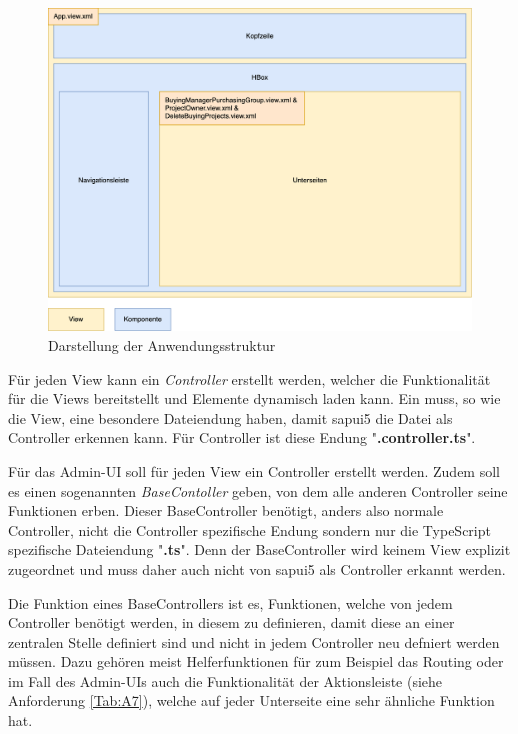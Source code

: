 \begin{figure}[H]
    \centering
    \includegraphics[width=\linewidth]{Images/AppStructure.png}
    \caption[Darstellung der Anwendungsstruktur]{Darstellung der Anwendungsstruktur}
    \label{fig:appstructure}
\end{figure}

Für jeden View kann ein \textit{Controller} erstellt werden, welcher die Funktionalität für die Views bereitstellt und Elemente dynamisch laden kann. 
Ein muss, so wie die View, eine besondere Dateiendung haben, damit \gls{sapui5} die Datei als Controller erkennen kann. Für Controller ist diese Endung "\textbf{.controller.ts}".

Für das Admin-UI soll für jeden View ein Controller erstellt werden. Zudem soll es einen sogenannten \textit{BaseContoller} geben, von dem alle anderen Controller seine Funktionen erben.
Dieser BaseController benötigt, anders also normale Controller, nicht die Controller spezifische Endung sondern nur die TypeScript spezifische Dateiendung "\textbf{.ts}".
Denn der BaseController wird keinem View explizit zugeordnet und muss daher auch nicht von \gls{sapui5} als Controller erkannt werden.  

Die Funktion eines BaseControllers ist es, Funktionen, welche von jedem Controller benötigt werden, in diesem zu definieren, damit diese an einer zentralen Stelle definiert sind und nicht in jedem Controller neu defniert werden müssen. 
Dazu gehören meist Helferfunktionen für zum Beispiel das Routing oder im Fall des Admin-UIs auch die Funktionalität der Aktionsleiste (siehe Anforderung \ref{Tab:A7}), welche auf jeder Unterseite eine sehr ähnliche Funktion hat.

